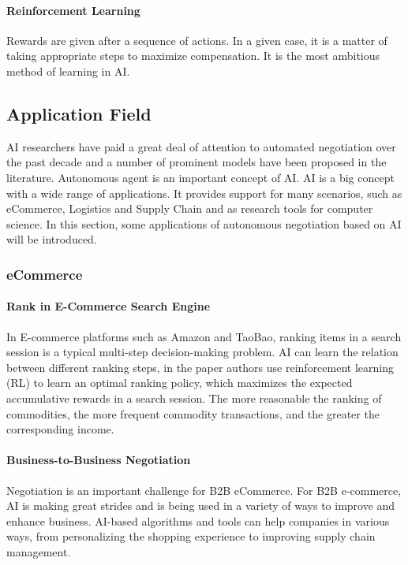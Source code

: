 \paragraph{Reinforcement Learning}
Rewards are given after a sequence of actions. In a given case, it is a matter of taking appropriate steps to maximize compensation. It is the most ambitious method of learning in AI.

\subsection{Application Field}
AI researchers have paid a great deal of attention to automated negotiation over the past decade and a number of prominent models have been proposed in the literature. Autonomous agent is an important concept of AI. AI is a big concept with a wide range of applications. It provides support for many scenarios, such as eCommerce, Logistics and Supply Chain and as research tools for computer science. In this section, some applications of autonomous negotiation based on AI will be introduced.

\subsubsection{eCommerce}
\paragraph{Rank in E-Commerce Search Engine} In E-commerce platforms such as Amazon and TaoBao, ranking items in a search session is a typical multi-step decision-making problem. AI can learn the relation between different ranking steps, in the paper
\parencite{Hu2018} authors use reinforcement learning (RL) to learn an optimal ranking policy, which maximizes the expected accumulative rewards in a search session. The more reasonable the ranking of commodities, the more frequent commodity transactions, and the greater the corresponding income.

\paragraph{Business-to-Business Negotiation} Negotiation is an important challenge for B2B eCommerce. For B2B e-commerce, AI is making great strides and is being used in a variety of ways to improve and enhance business\parencite{Hans01}. AI-based algorithms and tools can help companies in various ways, from personalizing the shopping experience to improving supply chain management.

